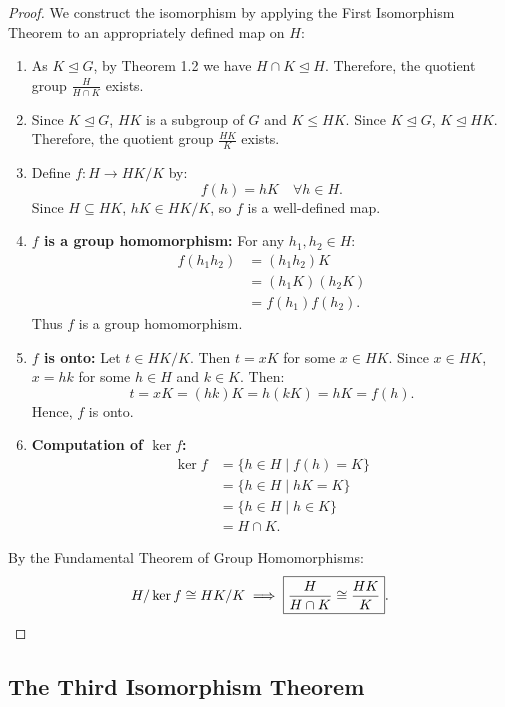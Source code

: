 \documentclass[12pt]{article}
\theoremstyle{definition}
\theoremstyle{plain}
\begin{document}
\begin{proof}
We construct the isomorphism by applying the First Isomorphism Theorem to an appropriately defined map on $H$:
\begin{enumerate}
    \item As $K \trianglelefteq G$, by Theorem 1.2 we have $H \cap K \trianglelefteq H$. Therefore, the quotient group $\frac{H}{H \cap K}$ exists.
    \item Since $K \trianglelefteq G$, $HK$ is a subgroup of $G$ and $K \le HK$. Since $K \trianglelefteq G$, $K \trianglelefteq HK$. Therefore, the quotient group $\frac{HK}{K}$ exists.
    \item Define $f: H \to HK/K$ by:
    \[
    f(h) = hK \quad \forall h \in H.
    \]
    Since $H \subseteq HK$, $hK \in HK/K$, so $f$ is a well-defined map.
    
    \item \textbf{$f$ is a group homomorphism:}
    For any $h_1, h_2 \in H$:
    \begin{align*}
    f(h_1 h_2) &= (h_1 h_2)K \\
    &= (h_1 K)(h_2 K) \\
    &= f(h_1) f(h_2).
    \end{align*}
    Thus $f$ is a group homomorphism.
    
    \item \textbf{$f$ is onto:}
    Let $t \in HK/K$. Then $t = xK$ for some $x \in HK$.
    Since $x \in HK$, $x = hk$ for some $h \in H$ and $k \in K$.
    Then:
    \[
    t = xK = (hk)K = h(kK) = hK = f(h).
    \]
    Hence, $f$ is onto.
    
    \item \textbf{Computation of $\ker f$:}
    \begin{align*}
    \ker f &= \{ h \in H \mid f(h) = K \} \\
    &= \{ h \in H \mid hK = K \} \\
    &= \{ h \in H \mid h \in K \} \\
    &= H \cap K.
    \end{align*}
\end{enumerate}
By the Fundamental Theorem of Group Homomorphisms:
\[
H/\ker f \cong HK/K \implies \boxed{\frac{H}{H \cap K} \cong \frac{HK}{K}}. \qedhere
\]
\end{proof}

\subsection{The Third Isomorphism Theorem}
\end{document}
